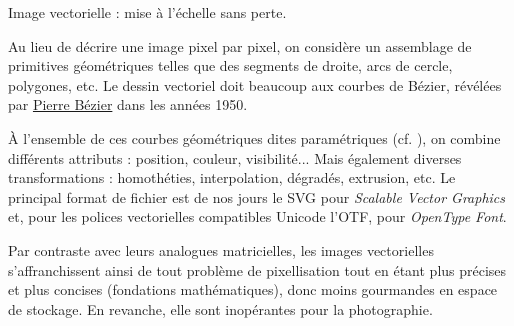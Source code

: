 \begin{marginfigure}%
\caption{\label{fig:V.6}Image vectorielle : mise à l'échelle sans perte.}
\end{marginfigure}

Au lieu de décrire une image pixel par pixel, on considère un assemblage de primitives géométriques telles que des segments de droite, arcs de cercle, polygones, etc. Le dessin vectoriel doit beaucoup aux courbes de Bézier, révélées par \href{https://fr.wikipedia.org/wiki/Pierre_B\%C3\%A9zier}{Pierre Bézier} dans les années 1950.

À l'ensemble de ces courbes géométriques dites paramétriques (cf. \href{https://fr.wikipedia.org/wiki/Image_vectorielle}{\faWikipediaW}), on combine différents attributs : position, couleur, visibilité... Mais également diverses transformations : homothéties, interpolation, dégradés, extrusion, etc. Le principal format de fichier est de nos jours le SVG pour \textit{Scalable Vector Graphics} et, pour les polices vectorielles compatibles Unicode l'OTF, pour \textit{OpenType Font}.

Par contraste avec leurs analogues matricielles, les images vectorielles s'affranchissent ainsi de tout problème de pixellisation tout en étant plus précises et plus concises (fondations mathématiques), donc moins gourmandes en espace de stockage. En revanche, elle sont inopérantes pour la photographie.



